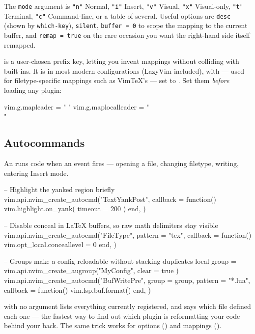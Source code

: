The \texttt{mode} argument is \texttt{"n"} Normal, \texttt{"i"} Insert,
\texttt{"v"} Visual, \texttt{"x"} Visual-only, \texttt{"t"} Terminal,
\texttt{"c"} Command-line, or a table of several. Useful options are
\texttt{desc} (shown by \texttt{which-key}), \texttt{silent},
\texttt{buffer = 0} to scope the mapping to the current buffer, and
\texttt{remap = true} on the rare occasion you want the right-hand side itself
remapped.

\begin{definition}[Leader]
	 is a user-chosen prefix key, letting you invent mappings without
	colliding with built-ins. It is  in most modern configurations
	(LazyVim included), with  --- used for filetype-specific
	mappings such as VimTeX's --- set to \key{\textbackslash}. Set them
	\emph{before} loading any plugin:
\begin{luacode}
vim.g.mapleader = " "
vim.g.maplocalleader = "\\"
\end{luacode}
\end{definition}

\subsection{Autocommands}

An  runs code when an event fires --- opening a file,
changing filetype, writing, entering Insert mode.

\begin{luacode}
-- Highlight the yanked region briefly
vim.api.nvim_create_autocmd("TextYankPost", {
  callback = function()
    vim.highlight.on_yank({ timeout = 200 })
  end,
})

-- Disable conceal in LaTeX buffers, so raw math delimiters stay visible
vim.api.nvim_create_autocmd("FileType", {
  pattern = "tex",
  callback = function()
    vim.opt_local.conceallevel = 0
  end,
})

-- Groups make a config reloadable without stacking duplicates
local group = vim.api.nvim_create_augroup("MyConfig", { clear = true })
vim.api.nvim_create_autocmd("BufWritePre", {
  group = group,
  pattern = "*.lua",
  callback = function() vim.lsp.buf.format() end,
})
\end{luacode}

\begin{note}
	 with no argument lists everything currently registered, and
	 says which file defined each one --- the
	fastest way to find out which plugin is reformatting your code behind your
	back. The same  trick works for options () and mappings ().
\end{note}

